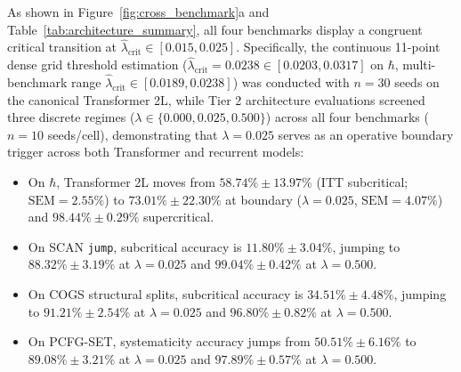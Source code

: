 \documentclass{article}
\theoremstyle{plain}
\theoremstyle{definition}
\begin{document}
As shown in Figure~\ref{fig:cross_benchmark}a and Table~\ref{tab:architecture_summary}, all four benchmarks display a congruent critical transition at $\hat{\lambda}_{\text{crit}} \in [0.015, 0.025]$. Specifically, the continuous 11-point dense grid threshold estimation ($\hat{\lambda}_{\text{crit}} = 0.0238 \in [0.0203, 0.0317]$ on $\hbar$, multi-benchmark range $\hat{\lambda}_{\text{crit}} \in [0.0189, 0.0238]$) was conducted with $n=30$ seeds on the canonical Transformer 2L, while Tier 2 architecture evaluations screened three discrete regimes ($\lambda \in \{0.000, 0.025, 0.500\}$) across all four benchmarks ($n=10$ seeds/cell), demonstrating that $\lambda = 0.025$ serves as an operative boundary trigger across both Transformer and recurrent models:
\begin{itemize}[noitemsep]
    \item On $\hbar$, Transformer 2L moves from $58.74\% \pm 13.97\%$ (ITT subcritical; $\text{SEM} = 2.55\%$) to $73.01\% \pm 22.30\%$ at boundary ($\lambda = 0.025$, $\text{SEM} = 4.07\%$) and $98.44\% \pm 0.29\%$ supercritical.
    \item On SCAN \texttt{jump}, subcritical accuracy is $11.80\% \pm 3.04\%$, jumping to $88.32\% \pm 3.19\%$ at $\lambda = 0.025$ and $99.04\% \pm 0.42\%$ at $\lambda = 0.500$.
    \item On COGS structural splits, subcritical accuracy is $34.51\% \pm 4.48\%$, jumping to $91.21\% \pm 2.54\%$ at $\lambda = 0.025$ and $96.80\% \pm 0.82\%$ at $\lambda = 0.500$.
    \item On PCFG-SET, systematicity accuracy jumps from $50.51\% \pm 6.16\%$ to $89.08\% \pm 3.21\%$ at $\lambda = 0.025$ and $97.89\% \pm 0.57\%$ at $\lambda = 0.500$.
\end{itemize}
\end{document}

